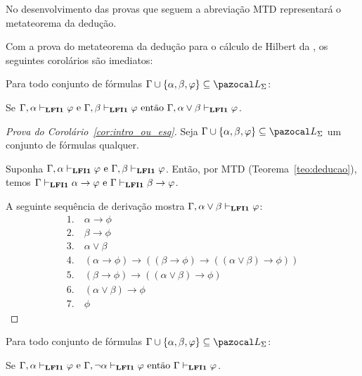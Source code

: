     No desenvolvimento das provas que seguem a abreviação MTD representará o metateorema da dedução. 
    
    Com a prova do metateorema da dedução para o cálculo de Hilbert da \lfium{}, os seguintes corolários são imediatos:

    \begin{corolario}\label{cor:intro_ou_esq}
        Para todo conjunto de fórmulas $\Gamma \cup \{\alpha, \beta, \phi\} \subseteq \ling{}$:

        \centering
        {\normalfont{}Se $\Gamma, \alpha \vdash_{{\normalfont\textbf{LFI1}}{}} \varphi \text{ e }\Gamma, \beta \vdash_{{\normalfont\textbf{LFI1}}{}} \varphi \text{ então } \Gamma, \alpha \lor \beta \vdash_{{\normalfont\textbf{LFI1}}{}} \varphi$.}
    \end{corolario}

    \begin{proof}[Prova do Corolário~\ref{cor:intro_ou_esq}]
        Seja $\Gamma \cup \{\alpha, \beta, \phi\} \subseteq \ling{}$ um conjunto de fórmulas qualquer.
        
        Suponha $\Gamma, \alpha \vdash_{{\normalfont\textbf{LFI1}}{}} \varphi \text{ e }\Gamma, \beta \vdash_{{\normalfont\textbf{LFI1}}{}} \varphi$. 
        Então, por MTD (Teorema~\ref{teo:deducao}), temos $\Gamma \vdash_{{\normalfont\textbf{LFI1}}{}} \alpha \to \varphi \text{ e }\Gamma \vdash_{{\normalfont\textbf{LFI1}}{}} \beta \to \varphi$.

        A seguinte sequência de derivação mostra $\Gamma, \alpha \lor \beta \vdash_{{\normalfont\textbf{LFI1}}{}} \varphi$:
        \begin{align*}
            1. ~& \alpha \to \phi \tag{MTD aplicado à suposição} \\
            2. ~& \beta \to \phi \tag{MTD aplicado à suposição} \\
            3. ~& \alpha \lor \beta \tag{Premissa} \\
            4. ~& (\alpha \to \phi) \to ((\beta \to \phi) \to ((\alpha \lor \beta) \to \phi)) \tag{Ax8} \\
            5. ~& (\beta \to \phi) \to ((\alpha \lor \beta) \to \phi) \tag{MP 1, 4}\\
            6. ~& (\alpha \lor \beta) \to \phi \tag{MP 2, 5} \\
            7. ~& \phi \tag{MP 3, 6}
        \end{align*}
    \end{proof}


    \begin{corolario}\label{cor:prova_por_casos}
        Para todo conjunto de fórmulas $\Gamma \cup \{\alpha, \beta, \phi\} \subseteq \ling{}$:

        \centering
        {\normalfont{}Se $\Gamma, \alpha \vdash_{{\normalfont\textbf{LFI1}}{}} \varphi \text{ e }\Gamma, \neg\alpha \vdash_{{\normalfont\textbf{LFI1}}{}} \varphi \text{ então } \Gamma \vdash_{{\normalfont\textbf{LFI1}}{}} \varphi$.}
    \end{corolario}

